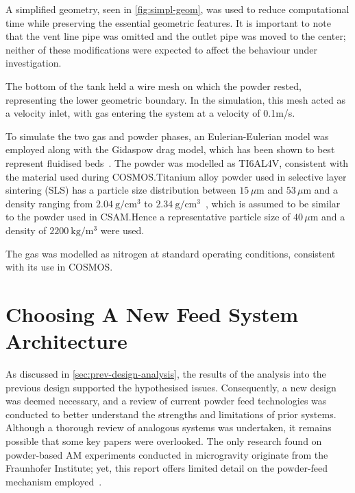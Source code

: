 A simplified geometry, seen in \autoref{fig:simpl-geom}, was used to reduce computational time while preserving the essential geometric features. It is important to note that the vent line pipe was omitted and the outlet pipe was moved to the center; neither of these modifications were expected to affect the behaviour under investigation. 

The bottom of the tank held a wire mesh on which the powder rested, representing the lower geometric boundary. In the simulation, this mesh acted as a velocity inlet, with gas entering the system at a velocity of 0.1m/s. 

To simulate the two gas and powder phases, an Eulerian-Eulerian model was employed along with the Gidaspow drag model, which has been shown to best represent fluidised beds~\cite{C6RA28615A}. The powder was modelled as TI6AL4V, consistent with the material used during COSMOS.\@ Titanium alloy powder used in selective layer sintering (SLS) has a particle size distribution between $15\,\mu\mathrm{m}$ and $53\,\mu\mathrm{m}$ and a density ranging from $2.04\ \mathrm{g/cm^3}$ to $2.34\ \mathrm{g/cm^3}$~\cite{ma17040952}, which is assumed to be similar to the powder used in CSAM.\@ Hence a representative particle size of $40\,\mu\mathrm{m}$ and a density of $2200\ \mathrm{kg/m^3}$ were used. 

The gas was modelled as nitrogen at standard operating conditions, consistent with its use in COSMOS.\@

\section{Choosing A New Feed System Architecture}\label{sec:system_architecture}
As discussed in \autoref{sec:prev-design-analysis}, the results of the analysis into the previous design supported the hypothesised issues. Consequently, a new design was deemed necessary, and a review of current powder feed technologies was conducted to better understand the strengths and limitations of prior systems. Although a thorough review of analogous systems was undertaken, it remains possible that some key papers were overlooked. The only research found on powder-based AM experiments conducted in microgravity originate from the Fraunhofer Institute; yet, this report offers limited detail on the powder-feed mechanism employed~\cite{OVERMEYER2025}. 

